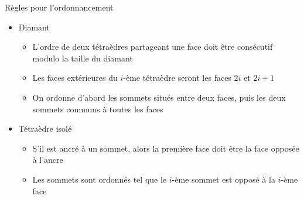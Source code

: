 \documentclass[9pt]{beamer}
\begin{document}
\begin{frame}
\begin{figure}[H]
\end{figure}
\begin{block}{Règles pour l'ordonnancement}
\begin{itemize}
\item Diamant
\begin{itemize}
\item L'ordre de deux tétraèdres partageant une face doit être consécutif modulo la taille du diamant
\item Les faces extérieures du $i$-ème tétraèdre seront les faces $2i$ et $2i+1$
\item On ordonne d'abord les sommets situés entre deux faces, puis les deux sommets communs à toutes les faces
\end{itemize}
\item Tétraèdre isolé
\begin{itemize}
\item S'il est ancré à un sommet, alors la première face doit être la face opposée à l'ancre
\item Les sommets sont ordonnés tel que le $i$-ème sommet est opposé à la $i$-ème face
\end{itemize}
\end{itemize}
\end{block}
\end{frame}
\end{document}
